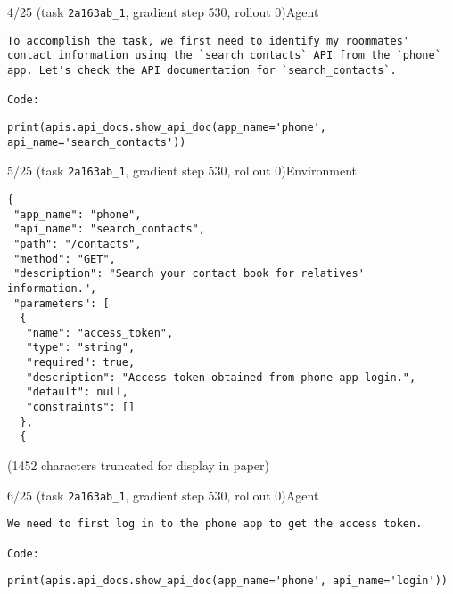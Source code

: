 \begin{minipage}{0.95\linewidth}
\begin{assistant_message_box}{{4/25 (task \texttt{2a163ab\_1}, gradient step 530, rollout 0)\hfill Agent}}
\scriptsize
\begin{Verbatim}[breaklines]
To accomplish the task, we first need to identify my roommates' contact information using the `search_contacts` API from the `phone` app. Let's check the API documentation for `search_contacts`.

Code:
\end{Verbatim}
\begin{tcolorbox}[colback=codebgcolor,boxrule=0pt]\begin{Verbatim}[breaklines]
print(apis.api_docs.show_api_doc(app_name='phone', api_name='search_contacts'))
\end{Verbatim}
\end{tcolorbox}\end{assistant_message_box}
\end{minipage}

\hspace*{8mm}%
\begin{minipage}{0.95\linewidth}
\begin{user_message_box}{{5/25 (task \texttt{2a163ab\_1}, gradient step 530, rollout 0)\hfill Environment}}
\scriptsize
\begin{Verbatim}[breaklines]
{
 "app_name": "phone",
 "api_name": "search_contacts",
 "path": "/contacts",
 "method": "GET",
 "description": "Search your contact book for relatives' information.",
 "parameters": [
  {
   "name": "access_token",
   "type": "string",
   "required": true,
   "description": "Access token obtained from phone app login.",
   "default": null,
   "constraints": []
  },
  {
\end{Verbatim}
(1452 characters truncated for display in paper)\end{user_message_box}
\end{minipage}

\begin{minipage}{0.95\linewidth}
\begin{assistant_message_box}{{6/25 (task \texttt{2a163ab\_1}, gradient step 530, rollout 0)\hfill Agent}}
\scriptsize
\begin{Verbatim}[breaklines]
We need to first log in to the phone app to get the access token.

Code:
\end{Verbatim}
\begin{tcolorbox}[colback=codebgcolor,boxrule=0pt]\begin{Verbatim}[breaklines]
print(apis.api_docs.show_api_doc(app_name='phone', api_name='login'))
\end{Verbatim}
\end{tcolorbox}\end{assistant_message_box}
\end{minipage}

